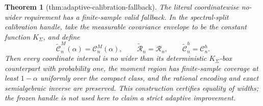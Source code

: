 \documentclass{article}
\newtheorem{theorem}{Theorem}
\begin{document}
\begin{theorem}[thm:adaptive-calibration-fallback]\label{thm:adaptive-calibration-fallback}
The literal coordinatewise no-wider requirement has a finite-sample valid
fallback. In the spectral-split calibration handle, take the measurable
covariance envelope to be the constant function \(K_\Sigma\), and define
\[
 \widetilde{\mathcal C}_n^M(\alpha)=\mathcal C_n^M(\alpha),
 \qquad
 \widetilde{\mathcal R}_n=\mathcal R_n,
 \qquad
 \widetilde{\mathcal C}_n^h=\mathcal C_n^h.
\]
Then every coordinate interval is no wider than its deterministic
\(K_\Sigma\)-box counterpart with probability one, the moment region has
finite-sample coverage at least \(1-\alpha\) uniformly over the compact
class, and the rational encoding and exact semialgebraic inverse are
preserved. This construction certifies equality of widths; the frozen
handle is not used here to claim a strict adaptive improvement.
\end{theorem}
\end{document}
